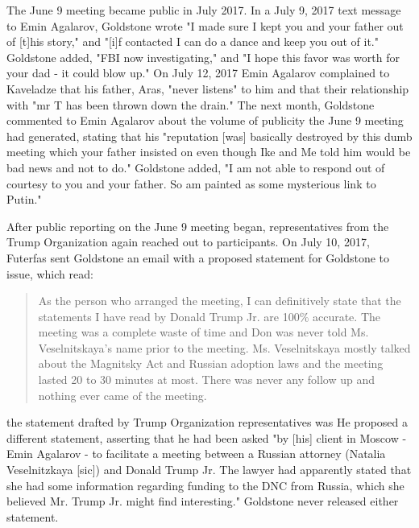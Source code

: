 The June 9 meeting became public in July 2017.
In a July 9, 2017 text message to Emin Agalarov, Goldstone wrote "I made sure I kept you and your father out of [t]his story,"%
and "[i]f contacted I can do a dance and keep you out of it."%
Goldstone added, "FBI now investigating," and "I hope this favor was worth for your dad - it could blow up."%
On July 12, 2017 Emin Agalarov complained to Kaveladze that his father, Aras, "never listens" to him and that their relationship with "mr T has been thrown down the drain."%
The next month, Goldstone commented to Emin Agalarov about the volume of publicity the June 9 meeting had generated, stating that his "reputation [was] basically destroyed by this dumb meeting which your father insisted on even though Ike and Me told him would be bad news and not to do."%
Goldstone added, "I am not able to respond out of courtesy to you and your father.
So am painted as some mysterious link to Putin."%

After public reporting on the June 9 meeting began, representatives from the Trump Organization again reached out to participants.
On July 10, 2017, Futerfas sent Goldstone an email with a proposed statement for Goldstone to issue, which read:

\begin{quote}
As the person who arranged the meeting, I can definitively state that the statements I have read by Donald Trump Jr. are 100\% accurate.
The meeting was a complete waste of time and Don was never told Ms. Veselnitskaya's name prior to the meeting.
Ms. Veselnitskaya mostly talked about the Magnitsky Act and Russian adoption laws and the meeting lasted 20 to 30 minutes at most.
There was never any follow up and nothing ever came of the meeting.%
\end{quote}

the statement drafted by Trump Organization representatives was
He proposed a different statement, asserting that he had been asked "by [his] client in Moscow - Emin Agalarov - to facilitate a meeting between a Russian attorney (Natalia Veselnitzkaya [sic]) and Donald Trump Jr.
The lawyer had apparently stated that she had some information regarding funding to the DNC from Russia, which she believed Mr. Trump Jr. might find interesting."%
Goldstone never released either statement.%

